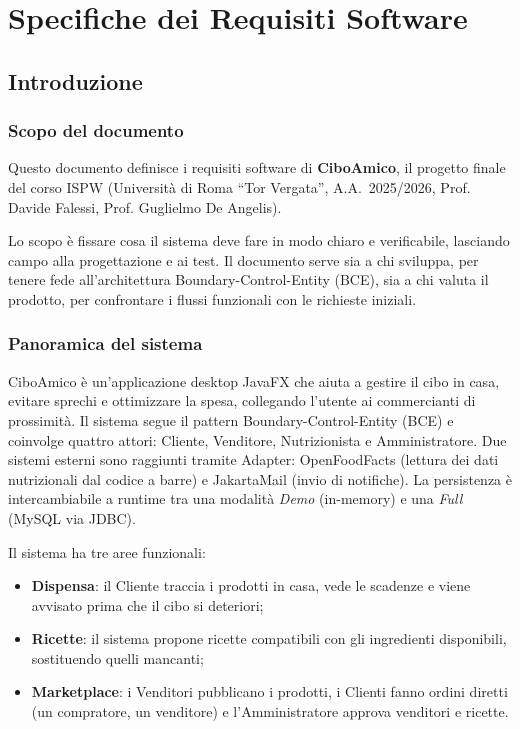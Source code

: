 \chapter{Specifiche dei Requisiti Software}
\label{cap:srs}

\section{Introduzione}
\label{sec:intro}

\subsection{Scopo del documento}
\label{subsec:scopo}

Questo documento definisce i requisiti software di \textbf{CiboAmico}, il progetto finale del corso ISPW (Università di Roma ``Tor Vergata'', A.A.\ 2025/2026, Prof. Davide Falessi, Prof. Guglielmo De Angelis).

Lo scopo è fissare cosa il sistema deve fare in modo chiaro e verificabile, lasciando campo alla progettazione e ai test. Il documento serve sia a chi sviluppa, per tenere fede all'architettura Boundary-Control-Entity (BCE), sia a chi valuta il prodotto, per confrontare i flussi funzionali con le richieste iniziali.

\subsection{Panoramica del sistema}
\label{subsec:panoramica}

CiboAmico è un'applicazione desktop JavaFX che aiuta a gestire il cibo in casa, evitare sprechi e ottimizzare la spesa, collegando l'utente ai commercianti di prossimità. Il sistema segue il pattern Boundary-Control-Entity (BCE) e coinvolge quattro attori: Cliente, Venditore, Nutrizionista e Amministratore. Due sistemi esterni sono raggiunti tramite Adapter: OpenFoodFacts (lettura dei dati nutrizionali dal codice a barre) e JakartaMail (invio di notifiche). La persistenza è intercambiabile a runtime tra una modalità \textit{Demo} (in-memory) e una \textit{Full} (MySQL via JDBC).

Il sistema ha tre aree funzionali:
\begin{itemize}
    \item \textbf{Dispensa}: il Cliente traccia i prodotti in casa, vede le scadenze e viene avvisato prima che il cibo si deteriori;
    \item \textbf{Ricette}: il sistema propone ricette compatibili con gli ingredienti disponibili, sostituendo quelli mancanti;
    \item \textbf{Marketplace}: i Venditori pubblicano i prodotti, i Clienti fanno ordini diretti (un compratore, un venditore) e l'Amministratore approva venditori e ricette.
\end{itemize}

